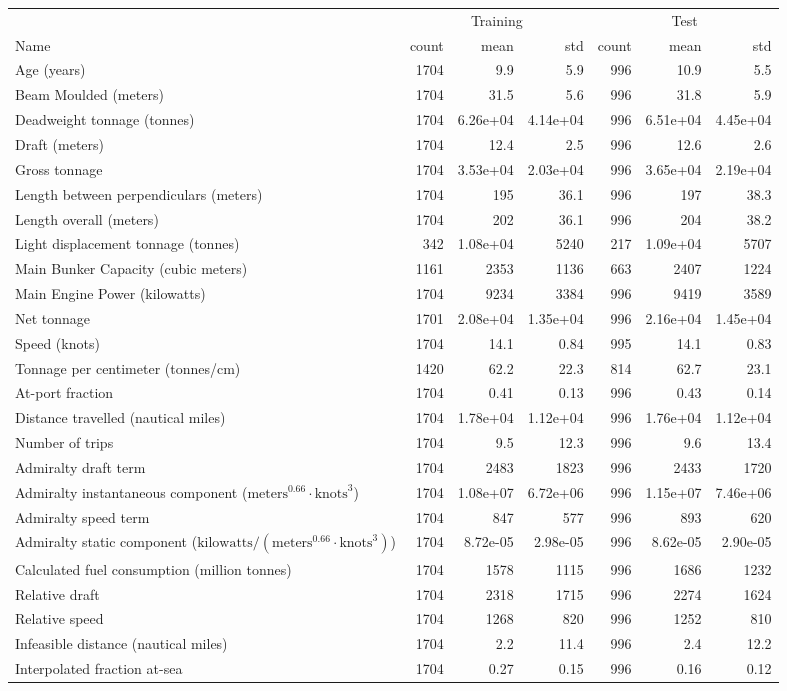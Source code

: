 
\begin{tabular}[t]{lrrrrrr}
\toprule
\multicolumn{1}{c}{ } & \multicolumn{3}{c}{Training} & \multicolumn{3}{c}{Test} \\
\cmidrule(l{3pt}r{3pt}){2-4} \cmidrule(l{3pt}r{3pt}){5-7}
Name & count & mean & std & count & mean & std\\
\midrule
Age (years) & 1704 & 9.9 & 5.9 & 996 & 10.9 & 5.5\\
Beam Moulded (meters) & 1704 & 31.5 & 5.6 & 996 & 31.8 & 5.9\\
Deadweight tonnage (tonnes) & 1704 & 6.26e+04 & 4.14e+04 & 996 & 6.51e+04 & 4.45e+04\\
Draft (meters) & 1704 & 12.4 & 2.5 & 996 & 12.6 & 2.6\\
Gross tonnage & 1704 & 3.53e+04 & 2.03e+04 & 996 & 3.65e+04 & 2.19e+04\\
\addlinespace
Length between perpendiculars (meters) & 1704 & 195 & 36.1 & 996 & 197 & 38.3\\
Length overall (meters) & 1704 & 202 & 36.1 & 996 & 204 & 38.2\\
Light displacement tonnage (tonnes) & 342 & 1.08e+04 & 5240 & 217 & 1.09e+04 & 5707\\
Main Bunker Capacity (cubic meters) & 1161 & 2353 & 1136 & 663 & 2407 & 1224\\
Main Engine Power (kilowatts) & 1704 & 9234 & 3384 & 996 & 9419 & 3589\\
\addlinespace
Net tonnage & 1701 & 2.08e+04 & 1.35e+04 & 996 & 2.16e+04 & 1.45e+04\\
Speed (knots) & 1704 & 14.1 & 0.84 & 995 & 14.1 & 0.83\\
Tonnage per centimeter (tonnes/cm) & 1420 & 62.2 & 22.3 & 814 & 62.7 & 23.1\\
At-port fraction & 1704 & 0.41 & 0.13 & 996 & 0.43 & 0.14\\
Distance travelled (nautical miles) & 1704 & 1.78e+04 & 1.12e+04 & 996 & 1.76e+04 & 1.12e+04\\
\addlinespace
Number of trips & 1704 & 9.5 & 12.3 & 996 & 9.6 & 13.4\\
Admiralty draft term & 1704 & 2483 & 1823 & 996 & 2433 & 1720\\
Admiralty instantaneous component ($\text{meters}^{0.66} \cdot \text{knots}^3$) & 1704 & 1.08e+07 & 6.72e+06 & 996 & 1.15e+07 & 7.46e+06\\
Admiralty speed term & 1704 & 847 & 577 & 996 & 893 & 620\\
Admiralty static component ($\text{kilowatts}/(\text{meters}^{0.66} \cdot \text{knots}^3)$) & 1704 & 8.72e-05 & 2.98e-05 & 996 & 8.62e-05 & 2.90e-05\\
\addlinespace
Calculated fuel consumption (million tonnes) & 1704 & 1578 & 1115 & 996 & 1686 & 1232\\
Relative draft & 1704 & 2318 & 1715 & 996 & 2274 & 1624\\
Relative speed & 1704 & 1268 & 820 & 996 & 1252 & 810\\
Infeasible distance (nautical miles) & 1704 & 2.2 & 11.4 & 996 & 2.4 & 12.2\\
Interpolated fraction at-sea & 1704 & 0.27 & 0.15 & 996 & 0.16 & 0.12\\
\bottomrule
\end{tabular}
